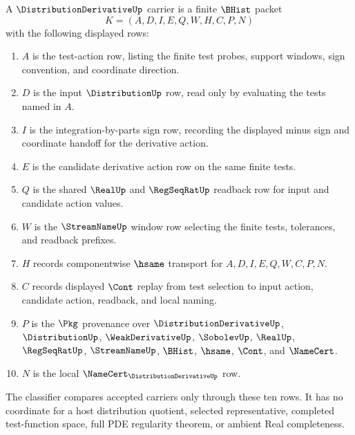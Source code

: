 \begin{definition}
\label{def:distribution-derivative-carrier}
A $\DistributionDerivativeUp$ carrier is a finite $\BHist$ packet
$$
K=(A,D,I,E,Q,W,H,C,P,N)
$$
with the following displayed rows:
\begin{enumerate}
\item $A$ is the test-action row, listing the finite test probes, support windows, sign convention, and coordinate direction.
\item $D$ is the input $\DistributionUp$ row, read only by evaluating the tests named in $A$.
\item $I$ is the integration-by-parts sign row, recording the displayed minus sign and coordinate handoff for the derivative action.
\item $E$ is the candidate derivative action row on the same finite tests.
\item $Q$ is the shared $\RealUp$ and $\RegSeqRatUp$ readback row for input and candidate action values.
\item $W$ is the $\StreamNameUp$ window row selecting the finite tests, tolerances, and readback prefixes.
\item $H$ records componentwise $\hsame$ transport for $A,D,I,E,Q,W,C,P,N$.
\item $C$ records displayed $\Cont$ replay from test selection to input action, candidate action, readback, and local naming.
\item $P$ is the $\Pkg$ provenance over $\DistributionDerivativeUp$, $\DistributionUp$, $\WeakDerivativeUp$, $\SobolevUp$, $\RealUp$, $\RegSeqRatUp$, $\StreamNameUp$, $\BHist$, $\hsame$, $\Cont$, and $\NameCert$.
\item $N$ is the local $\NameCert_{\DistributionDerivativeUp}$ row.
\end{enumerate}
The classifier compares accepted carriers only through these ten rows. It has no coordinate for a host distribution quotient, selected representative, completed test-function space, full PDE regularity theorem, or ambient Real completeness.
\end{definition}

